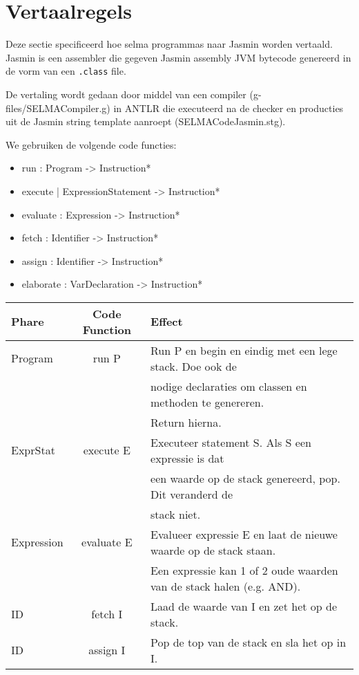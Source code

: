 \documentclass[]{article}
\begin{document}

\newpage
\section{Vertaalregels}
Deze sectie specificeerd hoe selma programmas naar Jasmin worden vertaald. Jasmin is een assembler die gegeven Jasmin assembly JVM bytecode genereerd in de vorm van een \texttt{.class} file.

De vertaling wordt gedaan door middel van een compiler (g-files/SELMACompiler.g) in ANTLR die executeerd na de checker en producties uit de Jasmin string template aanroept (SELMACodeJasmin.stg).

We gebruiken de volgende code functies:

\begin{itemize}
	\item run       : Program     -> Instruction*
	\item execute   | ExpressionStatement -> Instruction*
 	\item evaluate  : Expression  -> Instruction*
 	\item fetch		  : Identifier  -> Instruction*
 	\item assign    : Identifier   -> Instruction*
 	\item elaborate : VarDeclaration -> Instruction*
\end{itemize}

\begin{tabular}{| l | c | l |}
	Phare   & Code Function & Effect \\ 
	\hline \hline
  Program & run P       & Run P en begin en eindig met een lege stack. Doe ook de \\
  &&                      nodige declaraties om classen en methoden te genereren. \\
  &&											 Return hierna.\\ 
  \hline
  ExprStat & execute E  & Executeer statement S. Als S een expressie is dat \\
  && 										 een waarde op de stack genereerd, pop. Dit veranderd de \\
  &&											 stack niet. \\ 
  \hline
  Expression & evaluate E & Evalueer expressie E en laat de nieuwe waarde op de stack staan.\\
  &&												 Een expressie kan 1 of 2 oude waarden van de stack halen (e.g. AND). \\ 
  \hline
  ID				   & fetch I    & Laad de waarde van I en zet het op de stack. \\
  \hline
  ID					 & assign I   & Pop de top van de stack en sla het op in I. \\
  \hline
\end{tabular}
\end{document}
